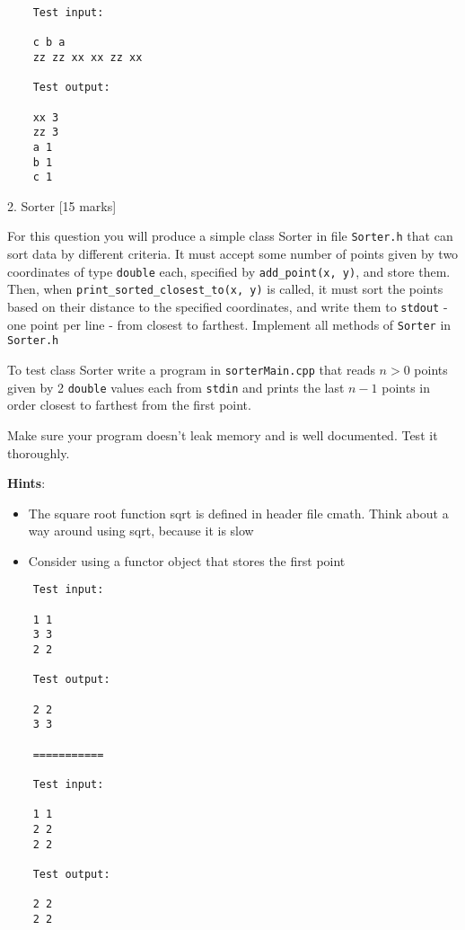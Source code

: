 \documentclass[a4paper,11pt]{article}
\begin{document}
{\small
\begin{verbatim}
    Test input:

    c b a
    zz zz xx xx zz xx
    
    Test output:
    
    xx 3
    zz 3
    a 1
    b 1
    c 1
\end{verbatim}
}


\linerule 

2. Sorter [15 marks]


For this question you will produce a simple class Sorter in file \texttt{Sorter.h} that
can sort data by different criteria. It must accept some number of points
given by two coordinates of type \texttt{double} each, specified by \texttt{add\_point(x, y)},
and store them. Then, when \texttt{print\_sorted\_closest\_to(x, y)} is called, it must
sort the points based on their distance to the specified coordinates, and
write them to \texttt{stdout} - one point per line - from closest to
farthest. Implement all methods of \texttt{Sorter} in \texttt{Sorter.h}

\medskip 

To test class Sorter write a program in \texttt{sorterMain.cpp} that reads $n > 0$ points
given by 2 \texttt{double} values each from \texttt{stdin} and prints the last $n-1$ points in
order closest to farthest from the first point.

\medskip 

Make sure your program doesn't leak memory and is well documented. Test it
thoroughly.


\textbf{Hints}:
\begin{itemize}
    \item The square root function sqrt is defined in header file cmath. Think
        about a way around using sqrt, because it is slow
    \item Consider using a functor object that stores the first point
\end{itemize}

\pagebreak

{\small
\begin{verbatim}
    Test input:

    1 1
    3 3 
    2 2 
    
    Test output:
    
    2 2
    3 3
    
    ===========
    
    Test input:
    
    1 1
    2 2 
    2 2 
    
    Test output:
    
    2 2
    2 2
\end{verbatim}
}
\end{document}
